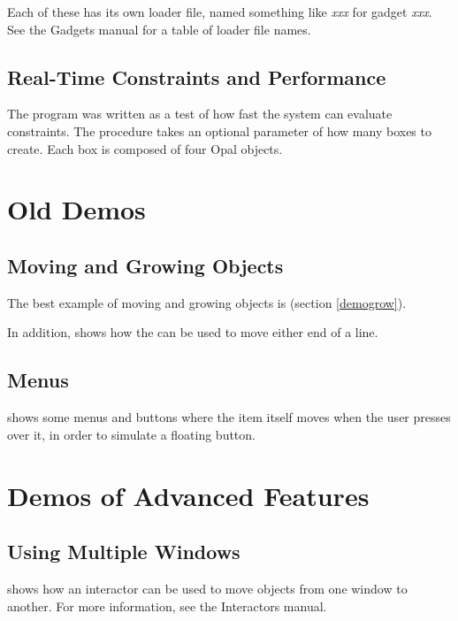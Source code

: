 Each of these has its own loader file, named something like
{\it xxx} for gadget {\it xxx}.  See the Gadgets manual for a
table of loader file names.



\subsection{Real-Time Constraints and Performance}
The program  was written as a test of how fast the
system can evaluate constraints.  The  procedure takes an
optional parameter of how many boxes to create.  Each box is composed of
four Opal objects.


\section{Old Demos}

\subsection{Moving and Growing Objects}

The best example of moving and growing objects is  (section
\ref{demogrow}).

In addition,  shows how the  can
be used to move either end of a line.

\subsection{Menus}

 shows some menus and buttons where the item
itself moves when the user presses over it, in order to simulate a floating
button.



\section{Demos of Advanced Features}

\subsection{Using Multiple Windows}

 shows how an interactor can be used to move objects
from one window to another.  For more information, see the Interactors manual.

